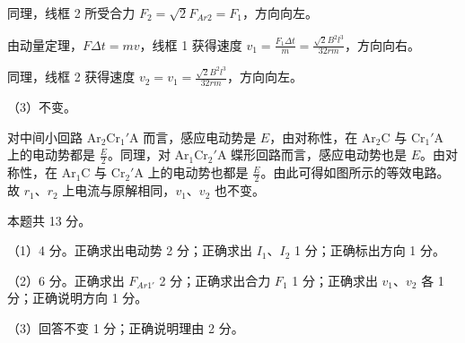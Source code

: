 \documentclass[\gkver]{gaokaozhenti}
\begin{document}
\begin{enumerate}
{同理，线框 2 所受合力 $F_{2} = \sqrt{2}F_{Ar2} = F_{1}$，方向向左。

由动量定理，$F\Delta t = mv$，线框 1 获得速度 $v_{1} = \frac{F_{1}\Delta t}{m} = \frac{\sqrt{2}B^{2}l^{3}}{32rm}$，方向向右。

同理，线框 2 获得速度 $v_{2} = v_{1} = \frac{\sqrt{2}B^{2}l^{3}}{32rm}$，方向向左。

（3）不变。

对中间小回路 Ar$_{2}$Cr$_{1}'$A 而言，感应电动势是 $E$，由对称性，在 Ar$_{2}$C 与 Cr$_{1}'$A 上的电动势都是 $\frac{E}{2}$。同理，对 Ar$_{1}$Cr$_{2}'$A 蝶形回路而言，感应电动势也是 $E$。由对称性，在 Ar$_{1}$C 与 Cr$_{2}'$A 上的电动势也都是 $\frac{E}{2}$。由此可得如图所示的等效电路。故 $r_{1}$、$r_{2}$ 上电流与原解相同，$v_{1}$、$v_{2}$ 也不变。

\onepicture[align=right, w=6cm]{}

本题共 13 分。

（1）4 分。正确求出电动势 2 分；正确求出 $I_{1}$、$I_{2}$ 1 分；正确标出方向 1 分。

（2）6 分。正确求出 $F_{Ar1'}$ 2 分；正确求出合力 $F_{1}$ 1 分；正确求出 $v_{1}$、$v_{2}$ 各 1 分；正确说明方向 1 分。

（3）回答不变 1 分；正确说明理由 2 分。
}

\end{enumerate}
\end{document}
